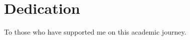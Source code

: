 \chapter*{Dedication}

\vspace{2in}

\begin{center}

To those who have supported me on this academic journey.

\end{center}

\newpage